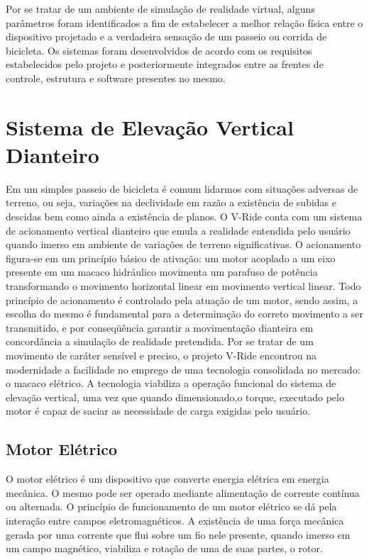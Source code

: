 Por se tratar de um ambiente de simulação de realidade virtual, alguns parâmetros foram identificados a fim de estabelecer a melhor relação física entre o dispositivo projetado e a verdadeira sensação de um passeio ou corrida de bicicleta. Os sistemas foram desenvolvidos de acordo com os requisitos estabelecidos pelo projeto e posteriormente integrados entre as frentes de controle, estrutura e software presentes no mesmo.

\section{Sistema de Elevação Vertical Dianteiro}

Em um simples passeio de bicicleta é comum lidarmos com situações adversas de terreno, ou seja, variações na declividade em razão a existência de subidas e descidas bem como ainda a existência de planos. O V-Ride conta com um sistema de acionamento vertical dianteiro que emula a realidade entendida pelo usuário quando imerso em ambiente de variações de terreno significativas.
O acionamento figura-se em um princípio básico de ativação: um motor acoplado a um eixo presente em um macaco hidráulico movimenta um parafuso de potência transformando o movimento horizontal linear em movimento vertical linear. Todo princípio de acionamento é controlado pela atuação de um motor, sendo assim, a escolha do mesmo é fundamental para a determinação do correto movimento a ser transmitido, e por conseqüência garantir a movimentação dianteira em concordância a simulação de realidade pretendida.
Por se tratar de um movimento de caráter sensível e preciso, o projeto V-Ride encontrou na modernidade a facilidade no emprego de uma tecnologia consolidada no mercado: o macaco elétrico. A tecnologia viabiliza a operação funcional do sistema de elevação vertical, uma vez que quando  dimensionado,o torque, executado pelo motor é capaz de saciar as necessidade de carga exigidas pelo usuário.

\subsection{Motor Elétrico}

O motor elétrico é um dispositivo que converte energia elétrica em energia mecânica. O mesmo pode ser operado mediante alimentação de corrente contínua ou alternada. O princípio de funcionamento de um motor elétrico se dá pela interação entre campos eletromagnéticos. A existência de uma força mecânica gerada por uma corrente que flui sobre um fio nele presente, quando imerso em um campo magnético, viabiliza e rotação de uma de suas partes, o rotor.

